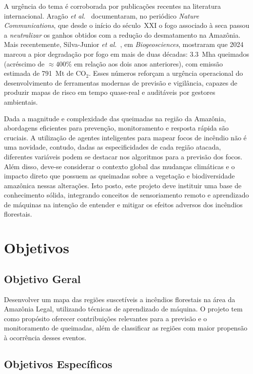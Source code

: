 A urgência do tema é corroborada por publicações recentes na literatura internacional. Aragão \emph{et al.}~\cite{aragao2018amazon} documentaram, no periódico \emph{Nature Communications}, que desde o início do século~XXI o fogo associado à seca passou a \emph{neutralizar} os ganhos obtidos com a redução do desmatamento na Amazônia. Mais recentemente, Silva-Junior \emph{et al.}~\cite{silvajunior2025amazon}, em \emph{Biogeosciences}, mostraram que 2024 marcou a pior degradação por fogo em mais de duas décadas: \SI{3,3}{\mega\hectare} queimados (acréscimo de \(\approx 400\%\) em relação aos dois anos anteriores), com emissão estimada de \SI{791}{\mega\tonne} de CO$_{2}$. Esses números reforçam a urgência operacional do desenvolvimento de ferramentas modernas de previsão e vigilância, capazes de produzir mapas de risco em tempo quase-real e auditáveis por gestores ambientais.

Dada a magnitude e complexidade das queimadas na região da Amazônia, abordagens eficientes para prevenção, monitoramento e resposta rápida são cruciais. A utilização de agentes inteligentes para mapear focos de incêndio não é uma novidade, contudo, dadas as especificidades de cada região atacada, diferentes variáveis podem se destacar nos algoritmos para a previsão dos focos. Além disso, deve-se considerar o contexto global das mudanças climáticas e o impacto direto que possuem as queimadas sobre a vegetação e biodiversidade amazônica nessas alterações. Isto posto, este projeto deve instituir uma base de conhecimento sólida, integrando conceitos de sensoriamento remoto e aprendizado de máquinas na intenção de entender e mitigar os efeitos adversos dos incêndios florestais.


\section{Objetivos}

\subsection{Objetivo Geral}

Desenvolver um mapa das regiões suscetíveis a incêndios florestais na área da Amazônia Legal, utilizando técnicas de aprendizado de máquina. O projeto tem como propósito oferecer contribuições relevantes para a previsão e o monitoramento de queimadas, além de classificar as regiões com maior propensão à ocorrência desses eventos.

\subsection{Objetivos Específicos}

